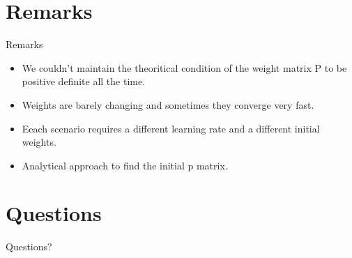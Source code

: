 \documentclass{beamer}
\begin{document}
\section{Remarks}
\begin{frame}{Remarks}
\begin{itemize}
\item We couldn't maintain the theoritical condition of the weight matrix P to be positive definite all the time. 
\item Weights are barely changing and sometimes they converge very fast.
\item Eeach scenario requires a different learning rate and a different initial weights.
\item Analytical approach to find the initial p matrix. 
\end{itemize}
\end{frame}
\section*{Questions}
\begin{frame}
\begin{LARGE}
\begin{center}
Questions?
\end{center}
\end{LARGE}
\end{frame}
\end{document}
